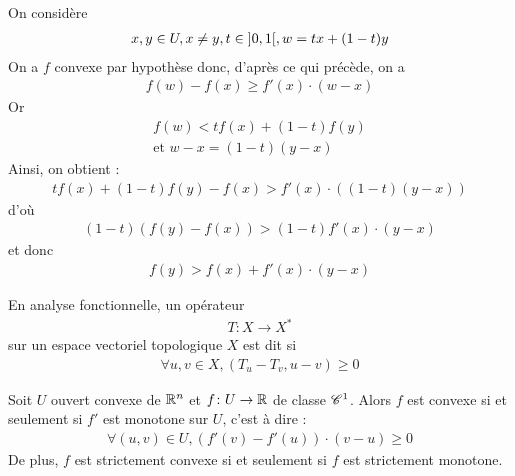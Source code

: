 \documentclass[french,a4paper,10pt]{article}
\begin{document}
\begin{myproof}
		On considère 
			\[\begin{aligned}
				x,y\in U,x\ne y,t\in\mathopen{]}0, 1\mathclose{[},w=tx+(1-t)y
			\end{aligned}\]
		On a $f$ convexe par hypothèse donc, d'après ce qui précède, on a
			\[\begin{aligned}
				f(w)-f(x)\ge f'(x)\cdot (w-x)
			\end{aligned}\]
		Or 
			\[\begin{gathered}
				f(w)< tf(x)+(1-t)f(y)\\
				\text{et }w-x=(1-t)(y-x)
			\end{gathered}\]
		Ainsi, on obtient :
			\[\begin{aligned}
				tf(x)+(1-t)f(y)-f(x)>f'(x)\cdot((1-t)(y-x))
			\end{aligned}\]
		d'où
			\[\begin{aligned}
				(1-t)(f(y)-f(x))>(1-t)f'(x)\cdot(y-x)
			\end{aligned}\]
		et donc
			\[\begin{aligned}
				f(y)>f(x)+f'(x)\cdot(y-x)
			\end{aligned}\]
	\end{myproof}
	
	\begin{oc-remark}
		En analyse fonctionnelle, un opérateur 
			\[\begin{aligned}
				T\colon X\to X^\ast
			\end{aligned}\]
		sur un espace vectoriel topologique $X$ est dit  si
			\[\begin{aligned}
				\forall u,v\in X,(T_u-T_v,u-v)\ge 0
			\end{aligned}\]
			
		
	\end{oc-remark}
	\begin{oc-proposition}
		Soit $U$ ouvert convexe de $\mathbb{R}^n$ et $f\colon U\to \mathbb{R}$ de classe $\mathscr{C}^1$. Alors $f$ est convexe si et seulement si $f'$ est monotone sur $U$, c'est à dire :
			\[\begin{aligned}
				\forall (u,v)\in U,(f'(v)-f'(u))\cdot (v-u)\ge 0
			\end{aligned}\]
		De plus, $f$ est strictement convexe si et seulement si $f$ est strictement monotone.
		
	\end{oc-proposition}
	
\end{document}
